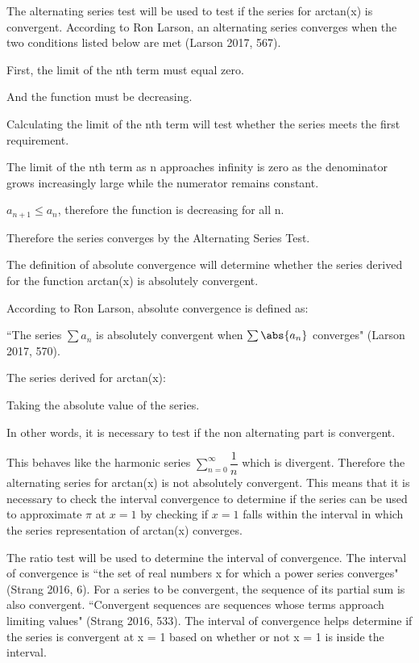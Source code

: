 The alternating series test will be used to test if the series for arctan(x) is convergent. According to Ron Larson, an alternating series converges when the two conditions listed below are met (Larson 2017, 567).

First, the limit of the nth term must equal zero.

And the function must be decreasing.

Calculating the limit of the nth term will test whether the series meets the first requirement.

The limit of the nth term as n approaches infinity is zero as the denominator grows increasingly large while the numerator remains constant.

\(a_{n+1} \leq a_{n}\), therefore the function is decreasing for all n. 

Therefore the series converges by the Alternating Series Test.

The definition of absolute convergence will determine whether the series derived for the function arctan(x) is absolutely convergent.

According to Ron Larson, absolute convergence is defined as: 

``The series \(\sum a_{n}\) is absolutely convergent when \(\sum \abs{a_{n}}\) converges" (Larson 2017, 570).

The series derived for arctan(x):

Taking the absolute value of the series.

In other words, it is necessary to test if the non alternating part is convergent.

This behaves like the harmonic series \(\sum\limits_{n=0}^{\infty} \dfrac{1}{n}\) which is divergent. Therefore the alternating series for arctan(x) is not absolutely convergent. This means that it is necessary to check the interval convergence to determine if the series can be used to approximate \(\pi\) at \(x = 1\) by checking if \(x = 1\) falls within the interval in which the series representation of arctan(x) converges.

The ratio test will be used to determine the interval of convergence. The interval of convergence is ``the set of real numbers x for which a power series converges" (Strang 2016, 6). For a series to be convergent, the sequence of its partial sum is also convergent. ``Convergent sequences are sequences whose terms approach limiting values" (Strang 2016, 533). The interval of convergence helps determine if the series is convergent at x = 1 based on whether or not x = 1 is inside the interval.

